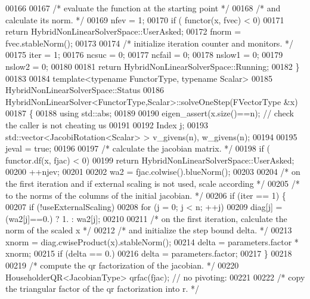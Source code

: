 \begin{DoxyCode}
00166 
00167     \textcolor{comment}{/*     evaluate the function at the starting point */}
00168     \textcolor{comment}{/*     and calculate its norm. */}
00169     nfev = 1;
00170     \textcolor{keywordflow}{if} ( functor(x, fvec) < 0)
00171         \textcolor{keywordflow}{return} HybridNonLinearSolverSpace::UserAsked;
00172     fnorm = fvec.stableNorm();
00173 
00174     \textcolor{comment}{/*     initialize iteration counter and monitors. */}
00175     iter = 1;
00176     ncsuc = 0;
00177     ncfail = 0;
00178     nslow1 = 0;
00179     nslow2 = 0;
00180 
00181     \textcolor{keywordflow}{return} HybridNonLinearSolverSpace::Running;
00182 \}
00183 
00184 \textcolor{keyword}{template}<\textcolor{keyword}{typename} FunctorType, \textcolor{keyword}{typename} Scalar>
00185 HybridNonLinearSolverSpace::Status
00186 HybridNonLinearSolver<FunctorType,Scalar>::solveOneStep(FVectorType  &x)
00187 \{
00188     \textcolor{keyword}{using} std::abs;
00189     
00190     eigen\_assert(x.size()==n); \textcolor{comment}{// check the caller is not cheating us}
00191 
00192     Index j;
00193     std::vector<JacobiRotation<Scalar> > v\_givens(n), w\_givens(n);
00194 
00195     jeval = \textcolor{keyword}{true};
00196 
00197     \textcolor{comment}{/* calculate the jacobian matrix. */}
00198     \textcolor{keywordflow}{if} ( functor.df(x, fjac) < 0)
00199         \textcolor{keywordflow}{return} HybridNonLinearSolverSpace::UserAsked;
00200     ++njev;
00201 
00202     wa2 = fjac.colwise().blueNorm();
00203 
00204     \textcolor{comment}{/* on the first iteration and if external scaling is not used, scale according */}
00205     \textcolor{comment}{/* to the norms of the columns of the initial jacobian. */}
00206     \textcolor{keywordflow}{if} (iter == 1) \{
00207         \textcolor{keywordflow}{if} (!useExternalScaling)
00208             \textcolor{keywordflow}{for} (j = 0; j < n; ++j)
00209                 diag[j] = (wa2[j]==0.) ? 1. : wa2[j];
00210 
00211         \textcolor{comment}{/* on the first iteration, calculate the norm of the scaled x */}
00212         \textcolor{comment}{/* and initialize the step bound delta. */}
00213         xnorm = diag.cwiseProduct(x).stableNorm();
00214         delta = parameters.factor * xnorm;
00215         \textcolor{keywordflow}{if} (delta == 0.)
00216             delta = parameters.factor;
00217     \}
00218 
00219     \textcolor{comment}{/* compute the qr factorization of the jacobian. */}
00220     HouseholderQR<JacobianType> qrfac(fjac); \textcolor{comment}{// no pivoting:}
00221 
00222     \textcolor{comment}{/* copy the triangular factor of the qr factorization into r. */}

\end{DoxyCode}
